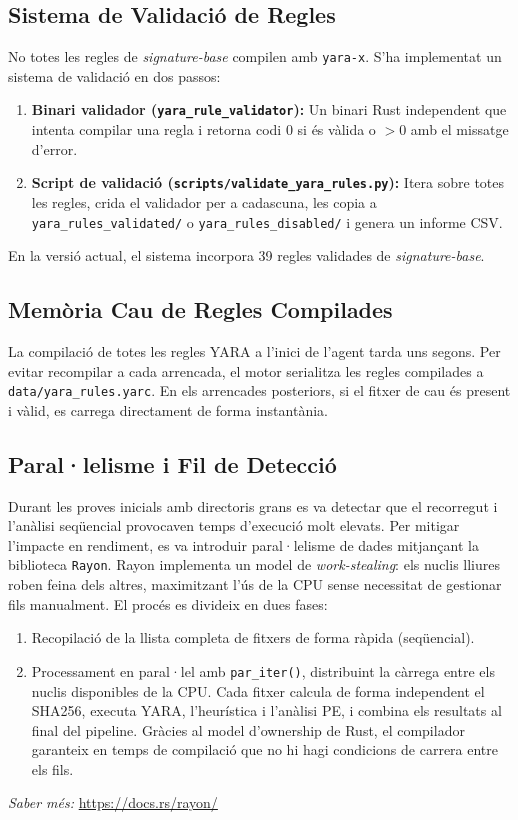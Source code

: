 \documentclass[12pt,a4paper]{report}
\begin{document}
\subsection{Sistema de Validació de Regles}
No totes les regles de \textit{signature-base} compilen amb \texttt{yara-x}. S'ha implementat un sistema de validació en dos passos:
\begin{enumerate}
    \item \textbf{Binari validador (\texttt{yara\_rule\_validator}):} Un binari Rust independent que intenta compilar una regla i retorna codi 0 si és vàlida o $>0$ amb el missatge d'error.
    \item \textbf{Script de validació (\texttt{scripts/validate\_yara\_rules.py}):} Itera sobre totes les regles, crida el validador per a cadascuna, les copia a \texttt{yara\_rules\_validated/} o \texttt{yara\_rules\_disabled/} i genera un informe CSV.
\end{enumerate}
En la versió actual, el sistema incorpora 39 regles validades de \textit{signature-base}.

\subsection{Memòria Cau de Regles Compilades}
La compilació de totes les regles YARA a l'inici de l'agent tarda uns segons. Per evitar recompilar a cada arrencada, el motor serialitza les regles compilades a \texttt{data/yara\_rules.yarc}. En els arrencades posteriors, si el fitxer de cau és present i vàlid, es carrega directament de forma instantània.

\subsection{Paral·lelisme i Fil de Detecció}
Durant les proves inicials amb directoris grans es va detectar que el recorregut i l'anàlisi seqüencial provocaven temps d'execució molt elevats. Per mitigar l'impacte en rendiment, es va introduir paral·lelisme de dades mitjançant la biblioteca \texttt{Rayon}. Rayon implementa un model de \textit{work-stealing}: els nuclis lliures roben feina dels altres, maximitzant l'ús de la CPU sense necessitat de gestionar fils manualment. El procés es divideix en dues fases:
\begin{enumerate}
    \item Recopilació de la llista completa de fitxers de forma ràpida (seqüencial).
    \item Processament en paral·lel amb \texttt{par\_iter()}, distribuint la càrrega entre els nuclis disponibles de la CPU. Cada fitxer calcula de forma independent el SHA256, executa YARA, l'heurística i l'anàlisi PE, i combina els resultats al final del pipeline. Gràcies al model d'ownership de Rust, el compilador garanteix en temps de compilació que no hi hagi condicions de carrera entre els fils.
\end{enumerate}
\textit{Saber més:} \url{https://docs.rs/rayon/}
\end{document}
